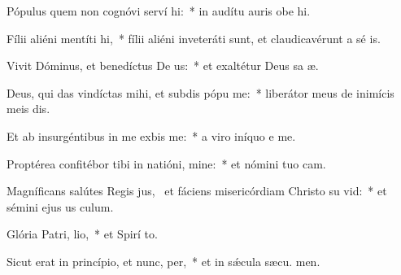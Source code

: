 \item Pópulus quem non cognóvi serví hi:~* in audítu auris obe hi.
\item Fílii aliéni mentíti  hi,~* fílii aliéni inveteráti sunt, et claudicavérunt a sé is.
\item Vivit Dóminus, et benedíctus De us:~* et exaltétur Deus sa æ.
\item Deus, qui das vindíctas mihi, et subdis pópu  me:~* liberátor meus de inimícis meis dis.
\item Et ab insurgéntibus in me exbis me:~* a viro iníquo e me.
\item Proptérea confitébor tibi in natióni, mine:~* et nómini tuo  cam.
\item Magníficans salútes Regis jus,~\pscross{} et fáciens misericórdiam Christo su vid:~* et sémini ejus us  culum.
\item Glória Patri,  lio,~* et Spirí to.
\item Sicut erat in princípio, et nunc,  per,~* et in sǽcula sæcu. men.
